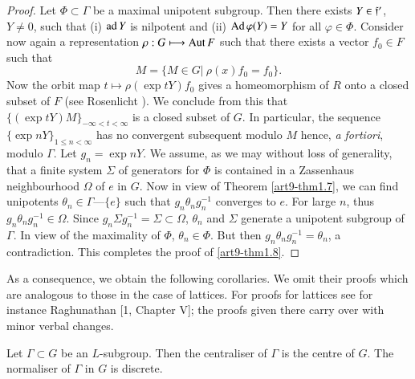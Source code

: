 \begin{proof}
Let $\Phi \subset \Gamma$ be a maximal unipotent subgroup. Then there exists $Y \in \mathfrak{f}'$, $Y \neq 0$, such that (i) $\operatorname{ad} Y$ is nilpotent and (ii) $\operatorname{Ad} \varphi (Y) = Y$ for all $\varphi \in \Phi$. Consider now again a representation $\rho : G \longmapsto \operatorname{Aut} F$  such that there exists a vector $f_0 \in F$ such that
$$
M = \{M \in G \big|~ \rho (x) f_0 = f_0\}.
$$
Now the orbit map $t \longmapsto \rho (\exp t Y) f_0$ gives a homeomorphism of $R$ onto a closed subset of $F$ (see Rosenlicht \cite{art9-rosenlicht-2}). We conclude from this that $\{(\exp t Y) M\}_{- \infty < t < \infty}$ is a closed subset of $G$. In particular, the sequence\pageoriginale $\{\exp n Y\}_{1 \leqslant n < \infty}$ has no convergent subsequent modulo $M$ hence, \textit{a fortiori}, modulo $\Gamma$. Let $g_n = \exp n Y$. We assume, as we may without loss of generality, that a finite system $\Sigma$ of generators for $\Phi$ is contained in a Zassenhaus neighbourhood $\Omega$ of $e$ in $G$. Now in view of Theorem \ref{art9-thm1.7}, we can find unipotents $\theta_n \in \Gamma$---$\{e\}$ such that $g_n \theta_n g^{-1}_n$ converges to $e$. For large $n$, thus $g_n \theta_n g^{-1}_n \in \Omega$. Since $g_n \Sigma g^{-1}_n = \Sigma \subset \Omega$, $\theta_n$ and $\Sigma$ generate a unipotent subgroup of $\Gamma$. In view of the maximality of $\Phi$, $\theta_n \in \Phi$. But then $g_n \theta_n g^{-1}_n = \theta_n$, a contradiction. This completes the proof of \ref{art9-thm1.8}.
\end{proof}

As a consequence, we obtain the following corollaries. We omit their proofs which are analogous to those in the case of lattices. For proofs for lattices see for instance Raghunathan [1, Chapter V]; the proofs given there carry over with minor verbal changes.


\begin{coro}\label{art9-coro1.9}
Let $\Gamma \subset G$ be an $L$-subgroup. Then the centraliser of $\Gamma$ is the centre of $G$. The normaliser of $\Gamma$ in $G$ is discrete.
\end{coro}

